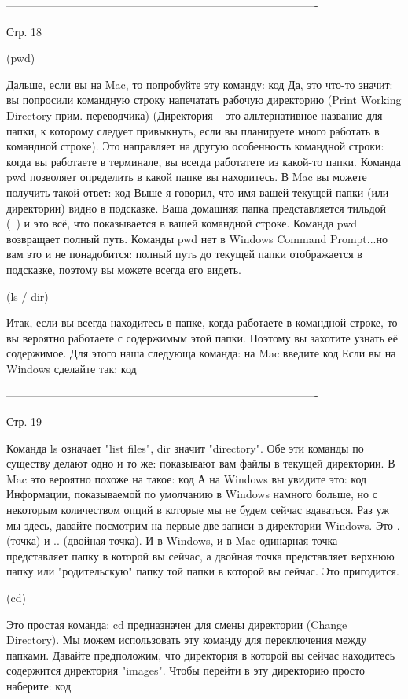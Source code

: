 -------------------------------------------------------------------------------------

Стр. 18

(pwd)

Дальше, если вы на Mac, то попробуйте эту команду:
{код}
Да, это что-то значит: вы попросили командную строку напечатать рабочую директорию
(Print Working Directory прим. переводчика) (Директория -- это альтернативное 
название для папки, к которому следует привыкнуть, если вы планируете много работать
в командной строке). Это направляет на другую особенность командной строки: когда вы
работаете в терминале, вы всегда работатете из какой-то папки. Команда pwd позволяет
определить в какой папке вы находитесь. В Mac вы можете получить такой ответ:
{код}
Выше я говорил, что имя вашей текущей папки (или директории) видно в подсказке. Ваша
домашняя папка представляется тильдой (~) и это всё, что показывается в вашей 
командной строке. Команда pwd возвращает полный путь.
Команды pwd нет в Windows Command Prompt...но вам это и не понадобится: полный путь
до текущей папки отображается в подсказке, поэтому вы можете всегда его видеть.

(ls / dir)

Итак, если вы всегда находитесь в папке, когда работаете в командной строке, то вы
вероятно работаете с содержимым этой папки. Поэтому вы захотите узнать её содержимое.
Для этого наша следующа команда: на Mac введите
{код}
Если вы на Windows сделайте так:
{код}

-------------------------------------------------------------------------------------

Стр. 19

Команда ls означает "list files", dir значит "directory". Обе эти команды по существу
делают одно и то же: показывают вам файлы в текущей директории. В Mac это вероятно 
похоже на такое:
{код}
А на Windows вы увидите это:
{код}
Информации, показываемой по умолчанию в Windows намного больше, но с некоторым
количеством опций в которые мы не будем сейчас вдаваться.
Раз уж мы здесь, давайте посмотрим на первые две записи в директории Windows. Это .
(точка) и .. (двойная точка). И в Windows, и в Mac одинарная точка представляет папку
в которой вы сейчас, а двойная точка представляет верхнюю папку или "родительскую"
папку той папки в которой вы сейчас. Это пригодится.

(cd)

Это простая команда: cd предназначен для смены директории (Change Directory). Мы
можем использовать эту команду для переключения между папками. Давайте предположим,
что директория в которой вы сейчас находитесь содержится директория "images". Чтобы
перейти в эту директорию просто наберите:
{код}

